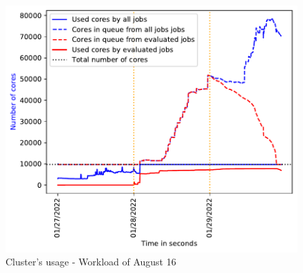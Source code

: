 \documentclass[conference,10pt]{IEEEtran}
\begin{document}
\begin{figure}\centering\includegraphics[width=1\linewidth]{../MBSS/plot/2022-08-16->2022-08-16_V10000_Fcfs_Used_nodes_Reduced_450_128_32_256_4_1024.pdf}\caption{Cluster's usage - Workload of August 16}\end{figure}
\end{document}
